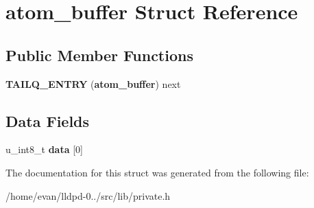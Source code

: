 \section{atom\-\_\-buffer \-Struct \-Reference}
\label{structatom__buffer}
\subsection*{\-Public \-Member \-Functions}
\begin{DoxyCompactItemize}
\item 
{\bfseries \-T\-A\-I\-L\-Q\-\_\-\-E\-N\-T\-R\-Y} ({\bf atom\-\_\-buffer}) next\label{structatom__buffer_a54f78c6413aa70a3a54d66520fa10b6e}

\end{DoxyCompactItemize}
\subsection*{\-Data \-Fields}
\begin{DoxyCompactItemize}
\item 
u\-\_\-int8\-\_\-t {\bfseries data} [0]\label{structatom__buffer_aa10767b4700c57247ec6b311b5036eb6}

\end{DoxyCompactItemize}


\-The documentation for this struct was generated from the following file\-:\begin{DoxyCompactItemize}
\item 
/home/evan/lldpd-\/0../src/lib/private.\-h\end{DoxyCompactItemize}
